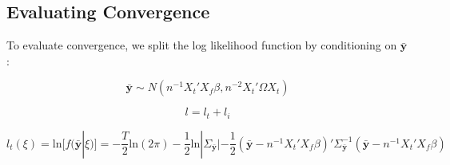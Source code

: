 \documentclass{TUT}
\numberwithin{equation}{section}
\theoremstyle{plain}
\begin{document}
\subsection{Evaluating Convergence}


To evaluate convergence, we split the log likelihood function by conditioning on $\bar{\mathbf{y}}$:



$$\bar{\mathbf{y}} \sim N(n^{-1}X_t'X_f\beta, n^{-2}X_t'\Omega X_t) $$

$$ l = l_t + l_i$$

$$ l_t(\xi) = \text{ln}[f(\bar{\mathbf{y}}|\xi)] = -\frac{T}{2}\text{ln}(2\pi) - \frac{1}{2}\text{ln}|\Sigma_{\bar{\mathbf{y}}}| - \frac{1}{2}(\bar{\mathbf{y}} - n^{-1}X_t'X_f\beta)'\Sigma_{\bar{\mathbf{y}}}^{-1}(\bar{\mathbf{y}} - n^{-1}X_t'X_f\beta) $$








\end{document}
